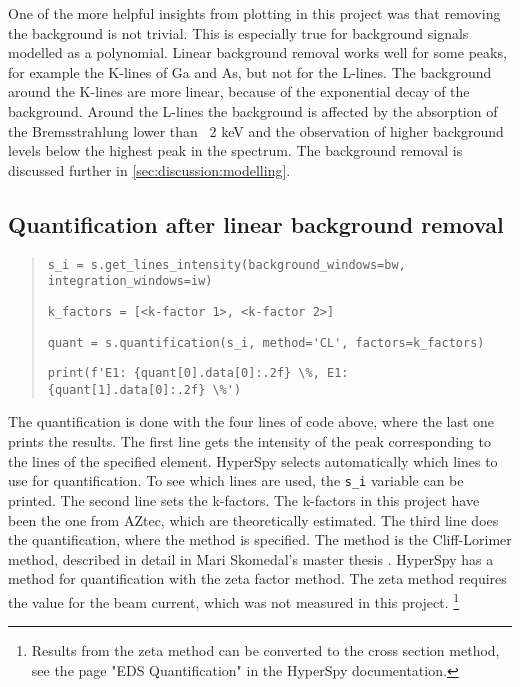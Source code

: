 One of the more helpful insights from plotting in this project was that removing the background is not trivial.
This is especially true for background signals modelled as a polynomial.
Linear background removal works well for some peaks, for example the K-lines of Ga and As, but not for the L-lines.
The background around the K-lines are more linear, because of the exponential decay of the background.
Around the L-lines the background is affected by the absorption of the Bremsstrahlung lower than ~2 keV and the observation of higher background levels below the highest peak in the spectrum.
The background removal is discussed further in \cref{sec:discussion:modelling}.




\subsection{Quantification after linear background removal}
\label{sec:discussion:steps:quantification:linear}

\begin{quote}
    \verb|s_i = s.get_lines_intensity(background_windows=bw, integration_windows=iw)|

    \verb|k_factors = [<k-factor 1>, <k-factor 2>]  |

    \verb|quant = s.quantification(s_i, method='CL', factors=k_factors)|

    \verb|print(f'E1: {quant[0].data[0]:.2f} \%, E1: {quant[1].data[0]:.2f} \%')|
\end{quote}

The quantification is done with the four lines of code above, where the last one prints the results.
The first line gets the intensity of the peak corresponding to the lines of the specified element.
HyperSpy selects automatically which lines to use for quantification.
To see which lines are used, the \verb|s_i| variable can be printed.
The second line sets the k-factors.
The k-factors in this project have been the one from AZtec, which are theoretically estimated.
The third line does the quantification, where the method is specified.
The method is the Cliff-Lorimer method, described in detail in Mari Skomedal's master thesis \cite[Sec. 2.2.3]{skomedal_improving_2022}.
HyperSpy has a method for quantification with the zeta factor method.
The zeta method requires the value for the beam current, which was not measured in this project. \footnote{Results from the zeta method can be converted to the cross section method, see the page "EDS Quantification" in the HyperSpy documentation.}


